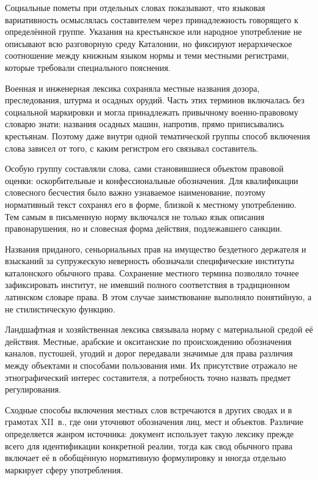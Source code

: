 Социальные пометы при отдельных словах показывают, что языковая вариативность осмыслялась составителем через принадлежность говорящего к определённой группе. Указания на крестьянское или народное употребление не описывают всю разговорную среду Каталонии, но фиксируют иерархическое соотношение между книжным языком нормы и теми местными регистрами, которые требовали специального пояснения.

Военная и инженерная лексика сохраняла местные названия дозора, преследования, штурма и осадных орудий. Часть этих терминов включалась без социальной маркировки и могла принадлежать привычному военно-правовому словарю знати; названия осадных машин, напротив, прямо приписывались крестьянам. Поэтому даже внутри одной тематической группы способ включения слова зависел от того, с каким регистром его связывал составитель.

Особую группу составляли слова, сами становившиеся объектом правовой оценки: оскорбительные и конфессиональные обозначения. Для квалификации словесного бесчестия было важно узнаваемое наименование, поэтому нормативный текст сохранял его в форме, близкой к местному употреблению. Тем самым в письменную норму включался не только язык описания правонарушения, но и словесная форма действия, подлежавшего санкции.

Названия приданого, сеньориальных прав на имущество бездетного держателя и взысканий за супружескую неверность обозначали специфические институты каталонского обычного права. Сохранение местного термина позволяло точнее зафиксировать институт, не имевший полного соответствия в традиционном латинском словаре права. В этом случае заимствование выполняло понятийную, а не стилистическую функцию.

Ландшафтная и хозяйственная лексика связывала норму с материальной средой её действия. Местные, арабские и окситанские по происхождению обозначения каналов, пустошей, угодий и дорог передавали значимые для права различия между объектами и способами пользования ими. Их присутствие отражало не этнографический интерес составителя, а потребность точно назвать предмет регулирования.

Сходные способы включения местных слов встречаются в других сводах и в грамотах XII~в., где они уточняют обозначения лиц, мест и объектов. Различие определяется жанром источника: документ использует такую лексику прежде всего для идентификации конкретной реалии, тогда как свод обычного права включает её в обобщённую нормативную формулировку и иногда отдельно маркирует сферу употребления.

